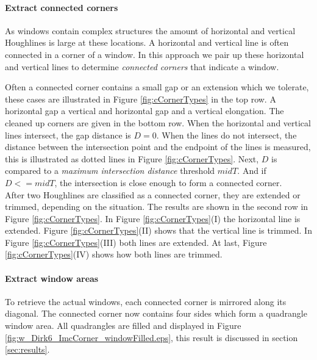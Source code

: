 \paragraph{Extract connected corners}
 As windows contain complex structures
the amount of horizontal and vertical Houghlines is large at these locations.
A horizontal and vertical line is often connected in a corner of a window.  In
this approach we pair up these horizontal and vertical lines to determine
\emph{connected corners} that indicate a window.

Often a connected corner contains a small gap or an extension which we tolerate,
these cases are illustrated in Figure \ref{fig:cCornerTypes} in the top row.
A horizontal gap a vertical and horizontal gap and a vertical elongation. The
cleaned up corners are given in the bottom row.  When the horizontal and
vertical lines intersect, the gap distance is $D=0$.  When the lines do not
intersect, the distance between the intersection point and the endpoint of the
lines is measured, this is illustrated as dotted lines in Figure
\ref{fig:cCornerTypes}.  Next, $D$ is compared to a \emph{maximum intersection
distance} threshold $midT$.  And if $D<=midT$, the intersection is close enough
to form a connected corner.\\

After two Houghlines are classified as a connected corner, they are extended or
trimmed, depending on the situation. The results are shown in the second row in
Figure \ref{fig:cCornerTypes}.
In Figure \ref{fig:cCornerTypes}(I)  the horizontal line is extended.  Figure
\ref{fig:cCornerTypes}(II) shows that the vertical line is trimmed.  In Figure
\ref{fig:cCornerTypes}(III) both lines are extended.  At last, Figure
\ref{fig:cCornerTypes}(IV) shows how both lines are trimmed.


\paragraph{Extract window areas}
To retrieve the actual windows, each connected corner is mirrored along its
diagonal. The connected corner now contains four sides which form a 
quadrangle window area.
All quadrangles are filled and displayed in Figure
\ref{fig:w_Dirk6_ImcCorner_windowFilled.eps}, this result is discussed in section
\ref{sec:results}.










